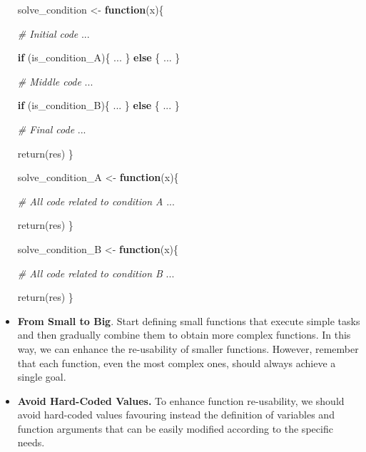 \documentclass[
  11pt,
]{book}
\newenvironment{Shaded}{\begin{snugshade}}{\end{snugshade}}
\newcommand{\CommentTok}[1]{\textcolor[rgb]{0.56,0.35,0.01}{\textit{#1}}}
\newcommand{\ControlFlowTok}[1]{\textcolor[rgb]{0.13,0.29,0.53}{\textbf{#1}}}
\newcommand{\FunctionTok}[1]{\textcolor[rgb]{0.00,0.00,0.00}{#1}}
\newcommand{\NormalTok}[1]{#1}
\newcommand{\OtherTok}[1]{\textcolor[rgb]{0.56,0.35,0.01}{#1}}
\newenvironment{code-tex-bad}
  {\begingroup\definecolor{shadecolor}{RGB}{255, 189, 185}}
  {\endgroup}
\newenvironment{code-tex-good}
  {\begingroup\definecolor{shadecolor}{RGB}{224, 240, 227}}
  {\endgroup}
\begin{document}
\begin{itemize}
  \begin{code-tex-bad}

\begin{Shaded}
\begin{Highlighting}[]
\NormalTok{solve\_condition }\OtherTok{\textless{}{-}} \ControlFlowTok{function}\NormalTok{(x)\{}

  \CommentTok{\# Initial code}
\NormalTok{  ...}

  \ControlFlowTok{if}\NormalTok{ (is\_condition\_A)\{}
\NormalTok{    ...}
\NormalTok{  \} }\ControlFlowTok{else}\NormalTok{ \{}
\NormalTok{    ...}
\NormalTok{  \}}

  \CommentTok{\# Middle code}
\NormalTok{  ...}

  \ControlFlowTok{if}\NormalTok{ (is\_condition\_B)\{}
\NormalTok{    ...}
\NormalTok{  \} }\ControlFlowTok{else}\NormalTok{ \{}
\NormalTok{    ...}
\NormalTok{  \}}

  \CommentTok{\# Final code}
\NormalTok{  ...}

  \FunctionTok{return}\NormalTok{(res)}
\NormalTok{\}}
\end{Highlighting}
\end{Shaded}

  \end{code-tex-bad}

  \begin{code-tex-good}

\begin{Shaded}
\begin{Highlighting}[]
\NormalTok{solve\_condition\_A }\OtherTok{\textless{}{-}} \ControlFlowTok{function}\NormalTok{(x)\{}

  \CommentTok{\# All code related to condition A}
\NormalTok{  ...}

  \FunctionTok{return}\NormalTok{(res)}
\NormalTok{\}}

\NormalTok{solve\_condition\_B }\OtherTok{\textless{}{-}} \ControlFlowTok{function}\NormalTok{(x)\{}

  \CommentTok{\# All code related to condition B}
\NormalTok{  ...}

  \FunctionTok{return}\NormalTok{(res)}
\NormalTok{\}}
\end{Highlighting}
\end{Shaded}

  \end{code-tex-good}
\item
  \textbf{From Small to Big}. Start defining small functions that execute simple tasks and then gradually combine them to obtain more complex functions. In this way, we can enhance the re-usability of smaller functions. However, remember that each function, even the most complex ones, should always achieve a single goal.
\item
  \textbf{Avoid Hard-Coded Values.} To enhance function re-usability, we should avoid hard-coded values favouring instead the definition of variables and function arguments that can be easily modified according to the specific needs.


\end{itemize}
\end{document}
